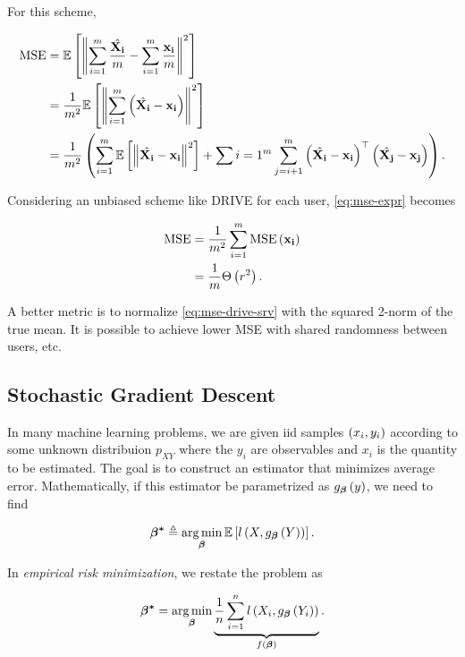 \documentclass[twoside]{article}
\begin{document}
For this scheme,

\begin{align}
    \mathrm{MSE} &= \mathbb{E}\left[ \left\lVert\sum_{i=1}^m\frac{\hat{\boldsymbol{\mathbf{X_i}}}}{m} - \sum_{i=1}^m\frac{\boldsymbol{\mathbf{x_i}}}{m}\right\rVert^2 \right] \\
                 &= \frac{1}{m^2}\mathbb{E}\left[ \left\lVert\sum_{i=1}^m\left(\hat{\boldsymbol{\mathbf{X_i}}}-\boldsymbol{\mathbf{x_i}}\right)\right\rVert^2 \right] \\
                 &= \frac{1}{m^2}\left(\sum_{i=1}^m\mathbb{E}\left[ \left\lVert\hat{\boldsymbol{\mathbf{X_i}}}-\boldsymbol{\mathbf{x_i}}\right\rVert^2 \right]+\sum{i=1}^m\sum_{j=i+1}^m\left(\hat{\boldsymbol{\mathbf{X_i}}}-\boldsymbol{\mathbf{x_i}}\right)^\top\left(\hat{\boldsymbol{\mathbf{X_j}}}-\boldsymbol{\mathbf{x_j}}\right)\right).
                 \label{eq:mse-expr}
\end{align}

Considering an unbiased scheme like DRIVE for each user, \eqref{eq:mse-expr} becomes

\begin{align}
    \mathrm{MSE} &= \frac{1}{m^2}\sum_{i=1}^m\mathrm{MSE}\left(\boldsymbol{\mathbf{x_i}}\right) \\
                 &= \frac{1}{m}\Theta\left(r^2\right).
                 \label{eq:mse-drive-srv}
\end{align}

A better metric is to normalize \eqref{eq:mse-drive-srv} with the squared 2-norm of the true mean. It is possible to achieve lower MSE with shared randomness between users, etc.

\subsection{Stochastic Gradient Descent}

In many machine learning problems, we are given iid samples \(\left(x_i,y_i\right)\) according to some unknown distribuion \(p_{XY}\) where the \(y_i\) are observables and \(x_i\) is the quantity to be estimated. The goal is to construct an estimator that minimizes average error. Mathematically, if this estimator be parametrized as \(g_{\boldsymbol{\mathbf{\beta}}}\left(y\right)\), we need to find

\begin{equation}
    \boldsymbol{\mathbf{\beta^*}} \triangleq \operatorname*{arg\,min}_{\boldsymbol{\mathbf{\beta}}}\mathbb{E}\left[ l\left(X,g_{\boldsymbol{\mathbf{\beta}}}\left(Y\right)\right) \right].
    \label{eq:beta-star-def}
\end{equation}

In \emph{empirical risk minimization}, we restate the problem as

\begin{equation}
    \boldsymbol{\mathbf{\beta^*}} = \operatorname*{arg\,min}_{\boldsymbol{\mathbf{\beta}}}\underbrace{\frac{1}{n}\sum_{i=1}^n l\left(X_i, g_{\boldsymbol{\mathbf{\beta}}}\left(Y_i\right)\right)}_{f\left(\boldsymbol{\mathbf{\beta}}\right)}.
    \label{eq:emp-risk-min}
\end{equation}
\end{document}
